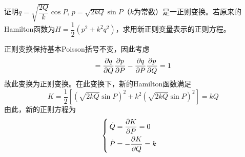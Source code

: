 \begin{question}
证明$q = \sqrt{\dfrac{2Q}{k}}\cos P,\,p = \sqrt{2kQ}\sin P$（$k$为常数）是一正则变换。若原来的Hamilton函数为$H = \dfrac12 (p^2+k^2q^2)$，求用新正则变量表示的正则方程。
\end{question}
\begin{solution}
正则变换保持基本Poisson括号不变，因此考虑
\begin{equation*}
	[q,p] = \frac{\pl q}{\pl Q} \frac{\pl p}{\pl P} - \frac{\pl q}{\pl P} \frac{\pl p}{\pl Q} = 1
\end{equation*}
故此变换为正则变换。在此变换下，新的Hamilton函数满足
\begin{equation*}
	K = \frac12 \left[\left(\sqrt{2kQ}\sin P\right)^2 + k^2 \left(\sqrt{2kQ}\sin P\right)^2\right] = kQ
\end{equation*}
由此，新的正则方程为
\begin{equation*}
\begin{cases}
	\dot{Q} = \dfrac{\partial K}{\partial P} = 0 \\[1.5ex]
	\dot{P} = -\dfrac{\partial K}{\partial Q} = k
\end{cases}
\end{equation*}
\end{solution}

